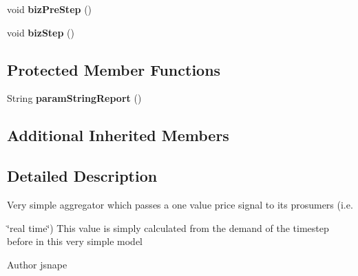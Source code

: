 \begin{DoxyCompactItemize}
\item 
\hypertarget{classuk_1_1ac_1_1dmu_1_1iesd_1_1cascade_1_1agents_1_1aggregators_1_1_equation_based_price_aggregator_with_lag_a6071f6baa2a265907b71f2f65adb9f68}{void {\bfseries biz\-Pre\-Step} ()}\label{classuk_1_1ac_1_1dmu_1_1iesd_1_1cascade_1_1agents_1_1aggregators_1_1_equation_based_price_aggregator_with_lag_a6071f6baa2a265907b71f2f65adb9f68}

\item 
\hypertarget{classuk_1_1ac_1_1dmu_1_1iesd_1_1cascade_1_1agents_1_1aggregators_1_1_equation_based_price_aggregator_with_lag_a12c693dc68d5be12186c1487048cafd6}{void {\bfseries biz\-Step} ()}\label{classuk_1_1ac_1_1dmu_1_1iesd_1_1cascade_1_1agents_1_1aggregators_1_1_equation_based_price_aggregator_with_lag_a12c693dc68d5be12186c1487048cafd6}

\end{DoxyCompactItemize}
\subsection*{Protected Member Functions}
\begin{DoxyCompactItemize}
\item 
\hypertarget{classuk_1_1ac_1_1dmu_1_1iesd_1_1cascade_1_1agents_1_1aggregators_1_1_equation_based_price_aggregator_with_lag_a9c58d0f52ffea032e207a7dea07e3150}{String {\bfseries param\-String\-Report} ()}\label{classuk_1_1ac_1_1dmu_1_1iesd_1_1cascade_1_1agents_1_1aggregators_1_1_equation_based_price_aggregator_with_lag_a9c58d0f52ffea032e207a7dea07e3150}

\end{DoxyCompactItemize}
\subsection*{Additional Inherited Members}


\subsection{Detailed Description}
Very simple aggregator which passes a one value price signal to its prosumers (i.\-e. 

\char`\"{}real time\char`\"{}) This value is simply calculated from the demand of the timestep before in this very simple model

\begin{DoxyAuthor}{Author}
jsnape 
\end{DoxyAuthor}


